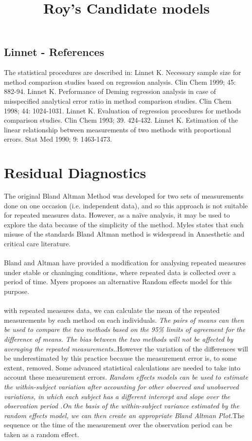 \documentclass[12pt, a4paper]{report}
\theoremstyle{plain}
\theoremstyle{definition}
\theoremstyle{remark}
\begin{document}
\section{Linnet - References}
The statistical procedures are described in:
Linnet K. Necessary sample size for method comparison studies based on regression analysis. Clin Chem 1999; 45: 882-94.
Linnet K. Performance of Deming regression analysis in case of misspecified analytical error ratio in method comparison studies. Clin Chem 1998; 44: 1024-1031.
Linnet K. Evaluation of regression procedures for methods comparison studies. Clin Chem 1993; 39. 424-432.
Linnet K. Estimation of the linear relationship between measurements of two methods with proportional errors. Stat Med 1990; 9: 1463-1473.






	\chapter{Residual Diagnostics}

\title{Roy's Candidate models}
The original Bland Altman Method was developed for two sets of
measurements done on one occasion (i.e. independent data), and so
this approach is not suitable for repeated measures data. However,
as a naïve analysis, it may be used to explore the data because of
the simplicity of the method. Myles states that such misuse of the
standards Bland Altman method is widespread in Anaesthetic and
critical care literature.
\\
\\
Bland and Altman have provided a modification for analysing
repeated measures under stable or chaninging conditions, where
repeated data is collected over a period of time. Myers proposes
an alternative Random effects model for this purpose.
\\
\\
with repeated measures data, we can
calculate the mean of the repeated measurements by each method on
each individuals. \emph{ The pairs of means can then be used to
	compare the two methods based on the 95\% limits of agreement for
	the difference of means. The bias between the two methods will not
	be affected by averaging the repeated measurements.}.However the
variation of the differences will be underestimated by this
practice because the measurement error is, to some extent,
removed. Some advanced statistical calculations are needed to take
into account these measurement errors. \emph{Random effects models
	can be used to estimate the within-subject variation after
	accounting for other observed and unobserved variations, in which
	each subject has a different intercept and slope over the
	observation period .On the basis of the within-subject variance
	estimated by the random effects model, we can then create an
	appropriate Bland Altman Plot.}The sequence or the time of the
measurement over the observation period can be taken as a random
effect.
\end{document}
